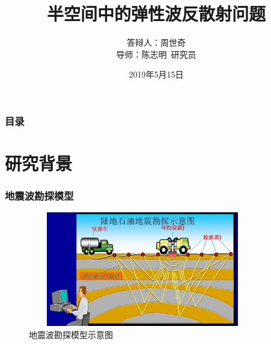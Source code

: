 \documentclass[8pt]{beamer}
\begin{document}
\title[博士论文答辩]{半空间中的弹性波反散射问题}

\author[周世奇]{答辩人：周世奇 \\ \vspace{0.3cm} 导师：陈志明~研究员}
\date[2019年5月]{2019年5月15日}




\begin{frame}
  \titlepage
\end{frame}

\begin{frame}
  \frametitle{目录}
  \setcounter{tocdepth}{1}
  \tableofcontents%
\end{frame}

\section{研究背景}

\begin{frame}
\frametitle{地震波勘探模型}
\begin{figure}

  \includegraphics[width=10cm,height=5cm]{./figure/seismic.png}
  \caption{地震波勘探模型示意图}
\end{figure}
\end{frame}
\end{document}
